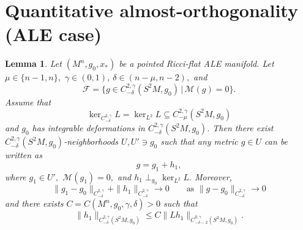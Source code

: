 \documentclass[12pt]{amsart}
\newcommand{\calM}{\mathcal{M}}
\renewcommand{\1}{{\mathbf 1}}
\newtheorem{lemma}[thm]{Lemma}
\theoremstyle{others}
\numberwithin{equation}{section}
\begin{document}
\section{Quantitative almost-orthogonality (ALE case)} \label{sec: almost-orthogonality ALE case}



\begin{lemma}\label{lemma:orthogonalellipticest1}
    Let $(M^n, g_0, x_*)$ be a pointed Ricci-flat ALE manifold. %
    Let $\mu \in \{n-1,n\},$ $\gamma \in (0,1)$, $\delta \in \left( n-\mu, n-2 \right),$ %
    and
        $$\mathcal F = \{ g \in C^{2, \gamma}_{-\delta} ( S^2 M , g_0) \, | \, \mathcal M (g ) = 0 \}.$$
            Assume 
that
$$\ker_{C^{2, \gamma}_{-\delta}} L = \ker_{L^2} L  \subseteq C^{2, \gamma}_{-\mu} (S^2M, g_0)$$ and
        $g_0$ has integrable deformations in $C^{2, \gamma}_{-\delta}(S^2M, g_0)$.
    Then there exist $C^{2,\gamma}_{-\delta}(S^2M, g_0)$-neighborhoods $U, U' \ni g_0$ such that any metric $g \in U$ can be written as
    \begin{equation}\label{orthogonalellipticest:orthogonality}
        g = g_1 + h_1,
    \end{equation}
    where $g_1 \in U',$ $\calM(g_1) = 0,$ and $h_1 \perp_{g_0} \ker_{L^2} L.$
    Moreover,
    \begin{equation} \label{lem orthogonal elliptic est, eqn comparable topologies}
        \| g_1 - g_0 \|_{C^{2, \gamma}_{-\delta}} + \| h_1 \|_{C^{2, \gamma}_{-\delta}} \to 0 \qquad \text{as } \| g - g_0 \|_{C^{2, \gamma}_{-\delta}} \to 0
    \end{equation}
    and there exists $C = C(M^n,g_0 , \gamma , \delta ) > 0$ such that 
    \begin{equation} \label{orthogonalellipticest:est}
        \| h_1 \|_{C^{2,\gamma}_{-\delta}(S^2M, g_0)} \leq C \|L h_1 \|_{C^{0,\gamma}_{-\delta - 2}(S^2M, g_0)}.
    \end{equation}
    
      
    

\end{lemma}
\end{document}
